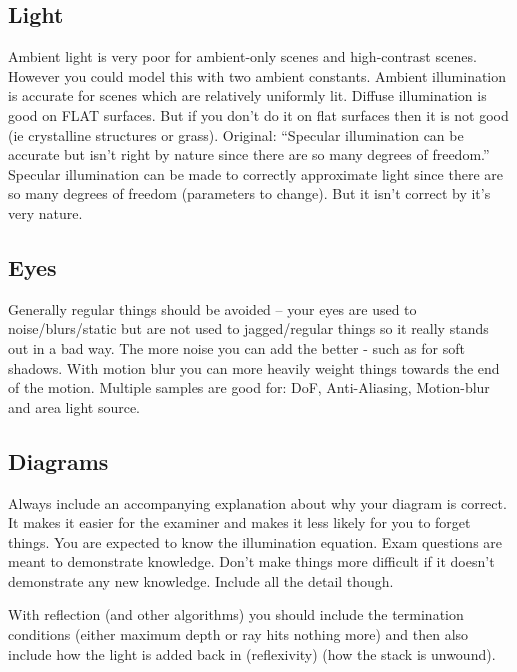 \documentclass[10pt, a4paper]{article}
\begin{document}
\subsection*{Light}

Ambient light is very poor for ambient-only scenes and high-contrast scenes. However you
could model this with two ambient constants. Ambient illumination is accurate for scenes
which are relatively uniformly lit. Diffuse illumination is good on FLAT surfaces.
But if you don't do it on flat surfaces then it is not good (ie crystalline structures or grass).
Original: ``Specular illumination can be accurate but isn't right by nature since
there are so many degrees of freedom.'' Specular illumination can be made to correctly
approximate light since there are so many degrees of freedom (parameters to change).
But it isn't correct by it's very nature.

\subsection*{Eyes}

Generally regular things should be avoided -- your eyes are used to noise/blurs/static but
are not used to jagged/regular things so it really stands out in a bad way.
The more noise you can add the better - such as for soft shadows.
With motion blur you can more heavily weight things towards the end of the motion.
Multiple samples are good for: DoF, Anti-Aliasing, Motion-blur and area light source.

\subsection*{Diagrams}

Always include an accompanying explanation about why your diagram is correct.
It makes it easier for the examiner and makes it less likely for you to forget things.
You are expected to know the illumination equation.
Exam questions are meant to demonstrate knowledge. Don't make things more difficult if it
doesn't demonstrate any new knowledge.
Include all the detail though.

With reflection (and other algorithms) you should include the termination conditions (either
maximum depth or ray hits nothing more) and then also include how the light is added back in
(reflexivity) (how the stack is unwound).
\end{document}
